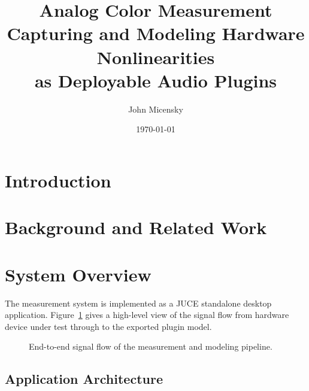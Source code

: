 \documentclass[11pt, letterpaper]{article}
\title{\textbf{Analog Color Measurement}\\[4pt]
       \large Capturing and Modeling Hardware Nonlinearities\\
       as Deployable Audio Plugins}
\author{John Micensky}
\date{\today}
\begin{document}
\maketitle
\tableofcontents
\newpage

\section{Introduction}
\label{sec:intro}

\section{Background and Related Work}
\label{sec:background}

\section{System Overview}
\label{sec:system}

The measurement system is implemented as a JUCE standalone desktop application.
Figure~\ref{fig:system_flow} gives a high-level view of the signal flow from
hardware device under test through to the exported plugin model.

\begin{figure}[H]
    \centering
    \caption{End-to-end signal flow of the measurement and modeling pipeline.}
    \label{fig:system_flow}
\end{figure}

\subsection{Application Architecture}
\end{document}
